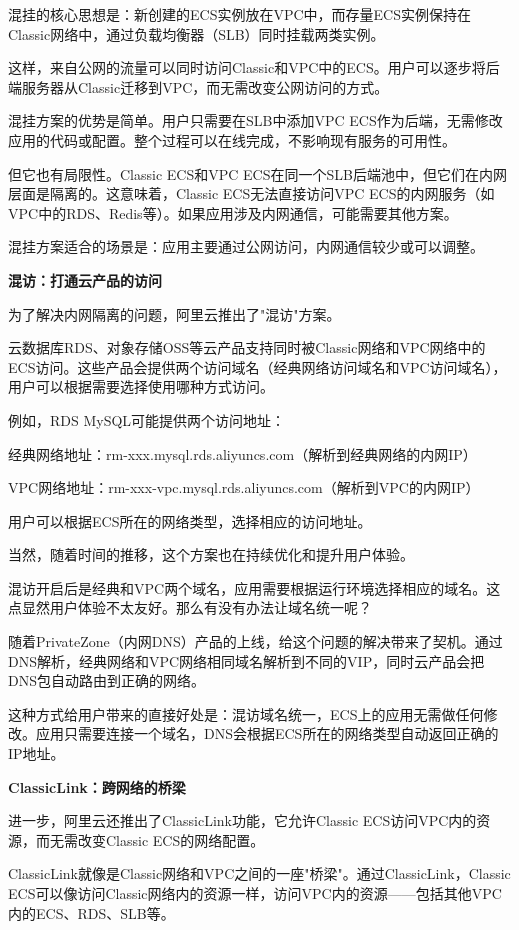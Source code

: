 混挂的核心思想是：新创建的ECS实例放在VPC中，而存量ECS实例保持在Classic网络中，通过负载均衡器（SLB）同时挂载两类实例。

这样，来自公网的流量可以同时访问Classic和VPC中的ECS。用户可以逐步将后端服务器从Classic迁移到VPC，而无需改变公网访问的方式。

混挂方案的优势是简单。用户只需要在SLB中添加VPC ECS作为后端，无需修改应用的代码或配置。整个过程可以在线完成，不影响现有服务的可用性。

但它也有局限性。Classic ECS和VPC ECS在同一个SLB后端池中，但它们在内网层面是隔离的。这意味着，Classic ECS无法直接访问VPC ECS的内网服务（如VPC中的RDS、Redis等）。如果应用涉及内网通信，可能需要其他方案。

混挂方案适合的场景是：应用主要通过公网访问，内网通信较少或可以调整。

\textbf{混访：打通云产品的访问}

为了解决内网隔离的问题，阿里云推出了"混访"方案。

云数据库RDS、对象存储OSS等云产品支持同时被Classic网络和VPC网络中的ECS访问。这些产品会提供两个访问域名（经典网络访问域名和VPC访问域名），用户可以根据需要选择使用哪种方式访问。

例如，RDS MySQL可能提供两个访问地址：

经典网络地址：rm-xxx.mysql.rds.aliyuncs.com（解析到经典网络的内网IP）

VPC网络地址：rm-xxx-vpc.mysql.rds.aliyuncs.com（解析到VPC的内网IP）

用户可以根据ECS所在的网络类型，选择相应的访问地址。

当然，随着时间的推移，这个方案也在持续优化和提升用户体验。

混访开启后是经典和VPC两个域名，应用需要根据运行环境选择相应的域名。这点显然用户体验不太友好。那么有没有办法让域名统一呢？

随着PrivateZone（内网DNS）产品的上线，给这个问题的解决带来了契机。通过DNS解析，经典网络和VPC网络相同域名解析到不同的VIP，同时云产品会把DNS包自动路由到正确的网络。

这种方式给用户带来的直接好处是：混访域名统一，ECS上的应用无需做任何修改。应用只需要连接一个域名，DNS会根据ECS所在的网络类型自动返回正确的IP地址。

\textbf{ClassicLink：跨网络的桥梁}

进一步，阿里云还推出了ClassicLink功能，它允许Classic ECS访问VPC内的资源，而无需改变Classic ECS的网络配置。

ClassicLink就像是Classic网络和VPC之间的一座"桥梁"。通过ClassicLink，Classic ECS可以像访问Classic网络内的资源一样，访问VPC内的资源——包括其他VPC内的ECS、RDS、SLB等。

